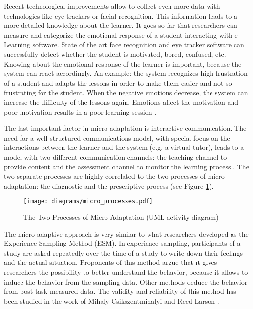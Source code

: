 Recent technological improvements allow to
collect even more data with technologies like eye-trackers or facial
recognition. This information leads to a more detailed
knowledge about the learner. It goes so far that researchers can measure and
categorize the emotional response of a student interacting with e-Learning software.
State of the art face recognition and eye tracker software can successfully
detect whether the student is motivated, bored, confused, etc. Knowing about
the emotional response of the learner is important, because the system can react
accordingly. An example: the system recognizes high frustration of a student
and adapts the lessons in order to make them easier and not so frustrating for
the student. When the negative emotions decrease, the system can increase the
difficulty of the lessons again. Emotions affect the motivation and poor
motivation results in a poor learning session \cite{Blanchard2004b, Blanchard2009,
DeVicente2003, D'Mello2007b}.

The last important factor in micro-adaptation is interactive communication.
The need for a well structured communications model, with special focus on the
interactions between the learner and the system (e.g. a virtual tutor), leads to
a model with two different communication channels: the teaching channel to provide content
and the assessment channel to monitor the learning process
\cite{Modritscher2004}. The two separate processes are highly correlated to
the two processes of micro-adaptation: the diagnostic and the prescriptive
process (see Figure \ref{processes}).

\begin{figure}
    \centering
    \texttt{[image: diagrams/micro\_processes.pdf]}
    \caption[The Two Processes of Micro-Adaptation (UML activity diagram)]
    {The Two Processes of Micro-Adaptation (UML activity diagram)}
    \label{processes}
\end{figure}

The micro-adaptive approach is very similar to what researchers developed as the
Experience Sampling Method (ESM). In experience sampling, participants of a
study are asked repeatedly over the time of a study to write down their
feelings and the actual situation. Proponents of this method argue that it
gives researchers the possibility to better understand the behavior, because
it allows to induce the behavior from the sampling data. Other methods deduce the
behavior from post-task measured data. The validity
and reliability of this method has been studied in the work of Mihaly
Csikszentmihalyi and Reed Larson \cite{Csikszentmihalyi1987a}.

